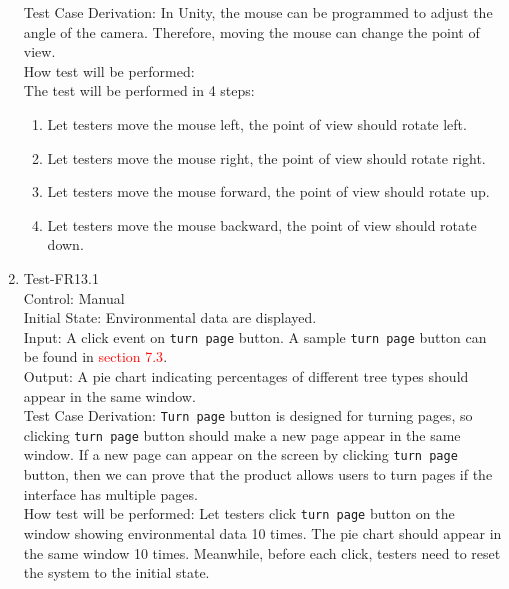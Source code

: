\documentclass[12pt, titlepage]{article}
\begin{document}
\begin{enumerate}
Test Case Derivation: In Unity, the mouse can be programmed to adjust the 
angle of the camera. Therefore,  moving the mouse can change the point of view.\\
					
How test will be performed: \\ The test will be performed in 4 steps:
\begin{enumerate}[1.]
    \item Let testers move the mouse left, the point of view should rotate left.
    \item Let testers move the mouse right, the point of view should rotate right.
    \item Let testers move the mouse forward, the point of view should rotate up.
    \item Let testers move the mouse backward, the point of view should rotate down.
\end{enumerate}

\item{Test-FR13.1\\}
Control: Manual\\ 

Initial State: Environmental data are displayed.\\

Input: A click event on \verb|turn page| button. A sample \verb|turn page| button
can be found in \textcolor{red}{section 7.3}.\\

Output: A pie chart indicating percentages of different tree types
should appear in the same window.\\

Test Case Derivation: \verb|Turn page| button is designed for turning pages, so 
clicking \verb|turn page| button should make a new page appear in the same window.
If a new page can appear on the screen by clicking \verb|turn page| button, then we 
can prove that the product allows users to turn pages if the interface has multiple
pages.\\
					
How test will be performed: Let testers click \verb|turn page| button on the 
window showing environmental data 10 times. The pie chart should
appear in the same window 10 times. 
Meanwhile, before each click, testers need to reset the system to the initial state.


\end{enumerate}
\end{document}
